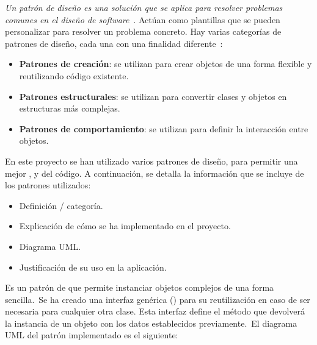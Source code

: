 
\textit{Un patrón de diseño es una solución que se aplica para resolver problemas comunes en el
diseño de software}~\cite{designPatternDefinition}.
Actúan como plantillas que se pueden personalizar para resolver un problema concreto.
Hay varias categorías de patrones de diseño, cada una con una finalidad diferente~\cite{designPatternClassification}:
\begin{itemize}
	\item \textbf{Patrones de creación}: se utilizan para crear objetos de una forma flexible y reutilizando código
	existente.
	\item \textbf{Patrones estructurales}: se utilizan para convertir clases y objetos en estructuras más complejas.
	\item \textbf{Patrones de comportamiento}: se utilizan para definir la interacción entre objetos.
\end{itemize}
\label{itm:categorias-patrones}

En este proyecto se han utilizado varios patrones de diseño, para permitir una mejor
,  y  del código.
A continuación, se detalla la información que se incluye de los patrones utilizados:
\begin{itemize}
	\item Definición / categoría.
	\item Explicación de cómo se ha implementado en el proyecto.
	\item Diagrama UML\@.
	\item Justificación de su uso en la aplicación.
\end{itemize}
\label{itm:uso-patrones}

Es un patrón de  que permite instanciar objetos complejos de una forma sencilla.\ Se ha creado una
interfaz genérica () para su reutilización en caso de ser necesaria para cualquier otra clase.
Esta interfaz define el método  que devolverá la instancia de un objeto con los datos establecidos
previamente.\ El diagrama UML del patrón implementado es el siguiente:

